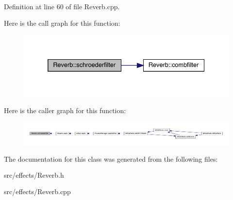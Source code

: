 Definition at line 60 of file Reverb.\+cpp.

Here is the call graph for this function\+:
\nopagebreak
\begin{figure}[H]
\begin{center}
\leavevmode
\includegraphics[width=332pt]{class_reverb_acbac17709b0977fc0fabdb7bc2aa2f50_cgraph}
\end{center}
\end{figure}
Here is the caller graph for this function\+:
\nopagebreak
\begin{figure}[H]
\begin{center}
\leavevmode
\includegraphics[width=350pt]{class_reverb_acbac17709b0977fc0fabdb7bc2aa2f50_icgraph}
\end{center}
\end{figure}


The documentation for this class was generated from the following files\+:\begin{DoxyCompactItemize}
\item 
src/effects/Reverb.\+h\item 
src/effects/Reverb.\+cpp\end{DoxyCompactItemize}
